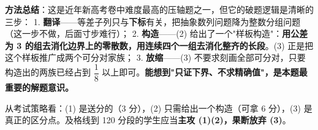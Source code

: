 \begin{answer}
\begin{gktip}
\textbf{方法总结}：这是近年新高考卷中难度最高的压轴题之一，但它的破题逻辑是清晰的三步：
1. \textbf{翻译}——等差子列只与\textbf{下标}有关，把抽象数列问题降为整数分组问题（这一步不做，后面寸步难行）；
2. \textbf{构造}——(2) 给出了一个"样板构造"：\textbf{用公差为 3 的组去消化边界上的零散数，用连续四个一组去消化整齐的长段}。(3) 正是把这个样板推广成两个可分对家族；
3. \textbf{放缩}——(3) 不要求刻画全部可分对，只要构造出的两族已经占到 $\dfrac18$ 以上即可。\textbf{能想到"只证下界、不求精确值"，是本题最重要的解题意识。}

从考试策略看：(1) 是送分的（3 分），(2) 只需给出一个构造（可拿 6 分），(3) 是真正的区分点。及格线到 120 分段的学生应当\textbf{主攻 (1)(2)，果断放弃 (3)}。
\end{gktip}




\end{answer}